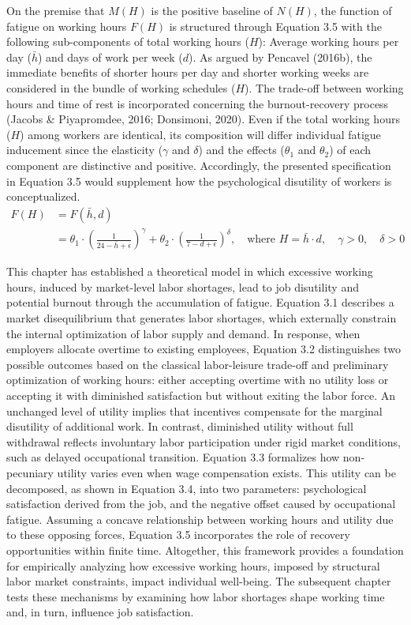 \documentclass[
  12pt,
]{article}
\begin{document}
On the premise that \(M(H)\) is the positive baseline of \(N(H)\), the
function of fatigue on working hours \(F(H)\) is structured through
Equation 3.5 with the following sub-components of total working hours
(\(H\)): Average working hours per day (\(\bar{h}\)) and days of work
per week (\(d\)). As argued by Pencavel (2016b), the immediate benefits
of shorter hours per day and shorter working weeks are considered in the
bundle of working schedules (\(H\)). The trade-off between working hours
and time of rest is incorporated concerning the burnout-recovery process
(Jacobs \& Piyapromdee, 2016; Donsimoni, 2020). Even if the total
working hours (\(H\)) among workers are identical, its composition will
differ individual fatigue inducement since the elasticity (\(\gamma\)
and \(\delta\)) and the effects (\(\theta_1\) and \(\theta_2\)) of each
component are distinctive and positive. Accordingly, the presented
specification in Equation 3.5 would supplement how the psychological
disutility of workers is conceptualized. \[
\begin{aligned}
F(H)
&=F(\bar{h}, d) \\
&= \theta_1 \cdot \left( \frac{1}{24-\bar{h}+\epsilon} \right)^\gamma + \theta_2 \cdot \left(\frac{1}{7-d+\epsilon}\right)^\delta
, \quad \text{where } H = \bar{h} \cdot d, \quad \gamma>0, \quad \delta>0
\end{aligned}
\tag{3.5}
\]

This chapter has established a theoretical model in which excessive
working hours, induced by market-level labor shortages, lead to job
disutility and potential burnout through the accumulation of fatigue.
Equation 3.1 describes a market disequilibrium that generates labor
shortages, which externally constrain the internal optimization of labor
supply and demand. In response, when employers allocate overtime to
existing employees, Equation 3.2 distinguishes two possible outcomes
based on the classical labor-leisure trade-off and preliminary
optimization of working hours: either accepting overtime with no utility
loss or accepting it with diminished satisfaction but without exiting
the labor force. An unchanged level of utility implies that incentives
compensate for the marginal disutility of additional work. In contrast,
diminished utility without full withdrawal reflects involuntary labor
participation under rigid market conditions, such as delayed
occupational transition. Equation 3.3 formalizes how non-pecuniary
utility varies even when wage compensation exists. This utility can be
decomposed, as shown in Equation 3.4, into two parameters: psychological
satisfaction derived from the job, and the negative offset caused by
occupational fatigue. Assuming a concave relationship between working
hours and utility due to these opposing forces, Equation 3.5
incorporates the role of recovery opportunities within finite time.
Altogether, this framework provides a foundation for empirically
analyzing how excessive working hours, imposed by structural labor
market constraints, impact individual well-being. The subsequent chapter
tests these mechanisms by examining how labor shortages shape working
time and, in turn, influence job satisfaction.
\end{document}
